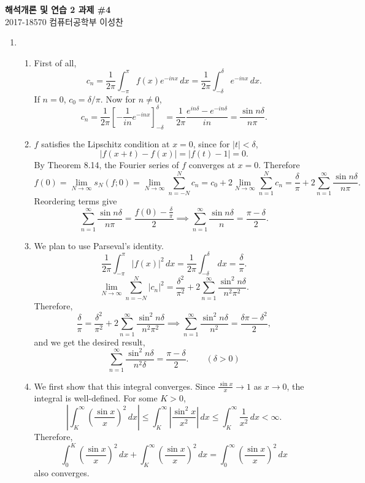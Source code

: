 \documentclass[12pt]{report}
\newcommand{\numl}[1]{\item[\large\textbf{\sffamily #1.}]}
\newcommand{\num}[1]{\item[\textbf{\sffamily #1}]}
\newcommand{\abs}[1]{\left| #1 \right|}
\newcommand{\paren}[1]{\left( #1 \right)}
\newcommand{\ra}{\rightarrow}
\renewcommand{\d}[1]{\,d{#1}}
\begin{document}
\begin{center}
    \textbf{\Large 해석개론 및 연습 2 과제 \#4}\\
    \large 2017-18570 컴퓨터공학부 이성찬
\end{center}
\begin{enumerate}

    \numl{1}
    \begin{enumerate}
        \num{(a)} First of all,
        \[
            c_n = \frac{1}{2\pi} \int_{-\pi}^\pi f(x) e^{-inx} \d{x} = \frac{1}{2\pi} \int_{-\delta}^{\delta} e^{-inx} \d{x}.
        \]
        If \(n = 0\), \(c_0 = \delta / \pi\). Now for \(n \neq 0\),
        \[
            c_n = \frac{1}{2\pi} \left[-\frac{1}{in}e^{-inx}\right]_{-\delta}^\delta = \frac{1}{2\pi} \frac{e^{in\delta} - e^{-in\delta}}{in} = \frac{\sin n\delta}{n\pi}.
        \]

        \num{(b)} \(f\) satisfies the Lipschitz condition at \(x = 0\), since for \(\abs{t} < \delta\),
        \[
            \abs{f(x + t) - f(x)} = \abs{f(t) - 1} = 0.
        \]
        By Theorem 8.14, the Fourier series of \(f\) converges at \(x = 0\). Therefore
        \[
            f(0) = \lim_{N \ra \infty} s_N(f; 0) = \lim_{N\ra\infty} \sum_{n=-N}^N c_n = c_0 + 2\lim_{N\ra\infty} \sum_{n=1}^N c_n = \frac{\delta}{\pi} + 2\sum_{n=1}^\infty \frac{\sin n\delta}{n\pi}.
        \]
        Reordering terms give
        \[
            \sum_{n=1}^\infty \frac{\sin n\delta}{n\pi} = \frac{f(0) - \frac{\delta}{\pi}}{2} \implies \sum_{n=1}^\infty \frac{\sin n\delta}{n} = \frac{\pi - \delta}{2}.
        \]

        \num{(c)} We plan to use Parseval's identity.
        \[
            \frac{1}{2\pi} \int_{-\pi}^\pi \abs{f(x)}^2 \d{x} = \frac{1}{2\pi}\int_{-\delta}^\delta \d{x} = \frac{\delta}{\pi}.
        \]
        \[
            \lim_{N\ra\infty}\sum_{n=-N}^N \abs{c_n}^2 = \frac{\delta^2}{\pi^2} + 2\sum_{n=1}^\infty \frac{\sin^2 n\delta}{n^2\pi^2}.
        \]
        Therefore,
        \[
            \frac{\delta}{\pi} = \frac{\delta^2}{\pi^2} + 2\sum_{n=1}^\infty \frac{\sin^2 n\delta}{n^2\pi^2} \implies \sum_{n=1}^\infty \frac{\sin^2 n\delta}{n^2} = \frac{\delta \pi - \delta^2}{2},
        \]
        and we get the desired result,
        \[
            \sum_{n=1}^\infty \frac{\sin^2 n\delta}{n^2 \delta} = \frac{\pi - \delta}{2}. \qquad (\delta > 0)
        \]

        \num{(d)} We first show that this integral converges. Since \(\frac{\sin x}{x} \ra 1\) as \(x \ra 0\), the integral is well-defined. For some \(K > 0\),
        \[
            \abs{\int_K^\infty \paren{\frac{\sin x}{x}}^2 \d{x}}  \leq \int_K^\infty \abs{\frac{\sin^2 x}{x^2}} \d{x} \leq \int_K^\infty \frac{1}{x^2} \d{x} < \infty.
        \]
        Therefore,
        \[
            \int_0^K \paren{\frac{\sin x}{x}}^2 \d{x} + \int_K^\infty \paren{\frac{\sin x}{x}}^2 \d{x} = \int_0^\infty \paren{\frac{\sin x}{x}}^2 \d{x}
        \]
        also converges.


\end{enumerate}
\end{enumerate}
\end{document}

